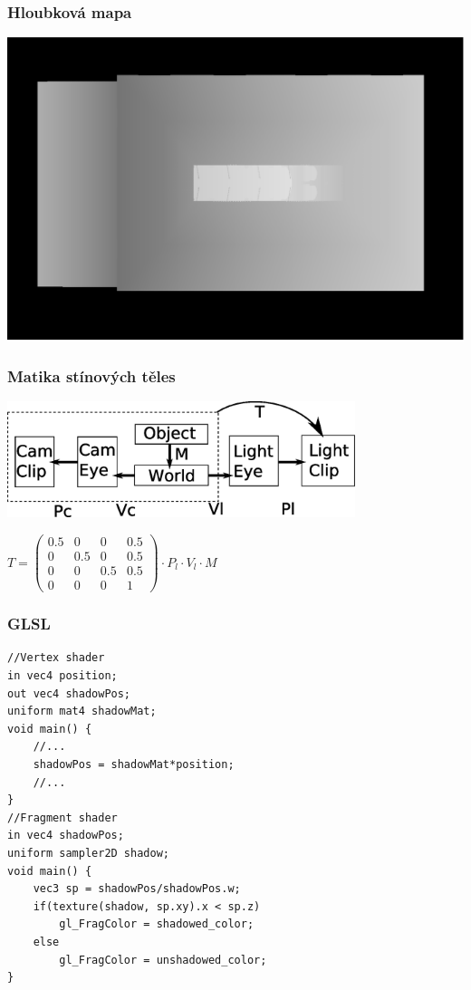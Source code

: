 \begin{frame}
    \frametitle{Hloubková mapa}
    \includegraphics[width=\textwidth]{pics/shadows/shadowMapping/depth.eps}
\end{frame}


\begin{frame}
    \frametitle{Matika stínových těles}

    \includegraphics[width=4in]{pics/shadows/shadowMapping/smspc.eps}
    
    \vfill

    $\displaystyle T = \left( \begin{array}{cccc}
        0.5 & 0   & 0   & 0.5 \\
        0   & 0.5 & 0   & 0.5 \\
        0   & 0   & 0.5 & 0.5 \\
        0   & 0   & 0   & 1 \end{array} \right) \cdot P_l \cdot V_l \cdot M$
\end{frame}

\begin{frame}[fragile]
    \frametitle{GLSL}

{\small
\begin{verbatim}
//Vertex shader
in vec4 position;
out vec4 shadowPos;
uniform mat4 shadowMat;
void main() {
    //...
    shadowPos = shadowMat*position;
    //...
}
//Fragment shader
in vec4 shadowPos;
uniform sampler2D shadow;
void main() {
    vec3 sp = shadowPos/shadowPos.w;
    if(texture(shadow, sp.xy).x < sp.z)
        gl_FragColor = shadowed_color;
    else
        gl_FragColor = unshadowed_color;
}
  \end{verbatim}
}
\end{frame}

